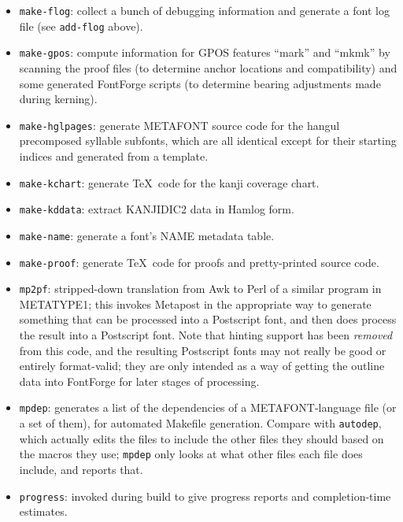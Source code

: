 \documentclass[14pt]{extarticle}
\begin{document}
\begin{itemize}
\item \texttt{make-flog}: collect a bunch of debugging information and
generate a font log file (see \texttt{add-flog} above).

\item \texttt{make-gpos}: compute information for GPOS features ``mark'' and
``mkmk'' by scanning the proof files (to determine anchor locations and
compatibility) and some generated FontForge scripts (to determine bearing
adjustments made during kerning).

\item \texttt{make-hglpages}: generate METAFONT source code for the hangul
precomposed syllable subfonts, which are all identical except for their
starting indices and generated from a template.

\item \texttt{make-kchart}: generate \TeX\ code for the kanji coverage
chart.

\item \texttt{make-kddata}: extract KANJIDIC2 data in Hamlog form.

\item \texttt{make-name}: generate a font's NAME metadata table.

\item \texttt{make-proof}: generate \TeX\ code for proofs and pretty-printed
source code.

\item \texttt{mp2pf}: stripped-down translation from Awk to Perl of a
similar program in METATYPE1; this invokes Metapost in the appropriate way
to generate something that can be processed into a Postscript font, and then
does process the result into a Postscript font.  Note that hinting support
has been \emph{removed} from this code, and the resulting Postscript fonts
may not really be good or entirely format-valid; they are only intended as a
way of getting the outline data into FontForge for later stages of
processing.

\item \texttt{mpdep}: generates a list of the dependencies of a
METAFONT-language file (or a set of them), for automated Makefile generation. 
Compare with \texttt{autodep}, which actually edits the files to include the
other files they should based on the macros they use; \texttt{mpdep} only
looks at what other files each file does include, and reports that.

\item \texttt{progress}: invoked during build to give progress reports and
completion-time estimates.

\end{itemize}
\end{document}
